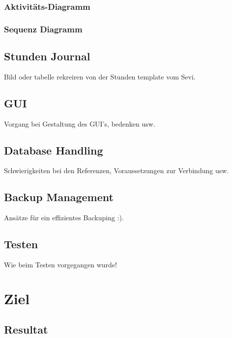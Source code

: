 \documentclass{article}
\begin{document}
\subsubsection{Aktivitäts-Diagramm}

\subsubsection{Sequenz Diagramm}

\subsection{Stunden Journal}
Bild oder tabelle rekreiren von der Stunden template vom Sevi.

\subsection{GUI}
Vorgang bei Gestaltung des GUI's, bedenken usw.

\subsection{Database Handling}
Schwierigkeiten bei den Referenzen, Voraussetzungen zur Verbindung usw.

\subsection{Backup Management}
Ansätze für ein effizientes Backuping :).

\subsection{Testen}
Wie beim Testen vorgegangen wurde!

\newpage

\section{Ziel}
\subsection{Resultat}
\end{document}
